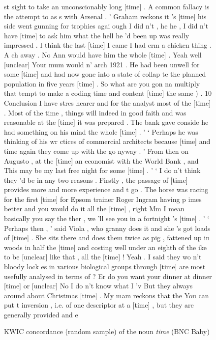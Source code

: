 \begin{figure}
\caption{KWIC concordance (random sample) of the noun \textit{time} (BNC Baby)}
\label{fig:sampleconcordance}
\hrulefill
\begin{fitverb}
st sight to take an unconscionably long [time] . A common fallacy is the attempt to as
s with Arsenal . ' Graham reckons it 's [time] his side went gunning for trophies agai
ough I did n't , he he , I did n't have [time] to ask him what the hell he 'd been up
was really impressed . I think the last [time] I came I had erm a chicken thing . A ch
 away . No Ann would have him the whole [time] . Yeah well [unclear] Your mum would n'
arch 1921 . He had been unwell for some [time] and had now gone into a state of collap
te the planned population in five years [time] . So what are you gon na multiply that
tempt to make a coding time and content [time] the same ) . 10 Conclusion I have stres
 hearer and for the analyst most of the [time] . Most of the time , things will indeed
in good faith and was reasonable at the [time] it was prepared . The bank gave conside
 he had something on his mind the whole [time] . ' ` Perhaps he was thinking of his wr
ctices of commercial architects because [time] and time again they come up with the go
nyway . ' From then on Augusto , at the [time] an economist with the World Bank , and
This may be my last free night for some [time] . ' ` I do n't think they 'd be in any
 two reasons . Firstly , the passage of [time] provides more and more experience and t
go . The horse was racing for the first [time] for Epsom trainer Roger Ingram having p
imes better and you would do it all the [time] , right Mm I mean basically you say the
ther , we 'll see you in a fortnight 's [time] . ' ` Perhaps then , ' said Viola , who
 granny does it and she 's got loads of [time] . She sits there and does them twice as
 pig , fattened up in woods in half the [time] and costing well under an eighth of the
ike to be [unclear] like that , all the [time] ! Yeah . I said they wo n't bloody lock
es in various biological groups through [time] are most usefully analysed in terms of
 ? Er do you want your dinner at dinner [time] or [unclear] No I do n't know what I 'v
 But they always around about Christmas [time] . My mam reckons that the You can put t
inversion , i.e. of one descriptor at a [time] , but they are generally provided and e
\end{fitverb}
\hrulefill
\end{figure}

